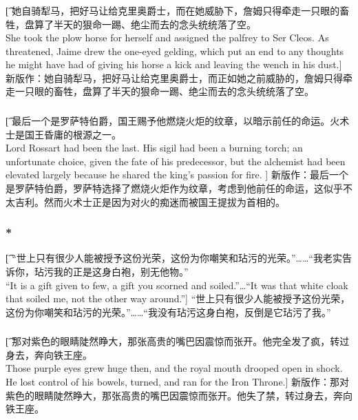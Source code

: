 \documentclass[12pt,a4paper]{article}
\begin{document}
\subsubsection{}\t[
	她自骑犁马，把好马让给克里奥爵士，而在她威胁下，詹姆只得牵走一只眼的畜牲，盘算了半天的狠命一踢、绝尘而去的念头统统落了空。\\
	She took the plow horse for herself and assigned the palfrey to Ser Cleos. As threatened, Jaime drew the one-eyed gelding, which put an end to any thoughts he might have had of giving his horse a kick and leaving the wench in his dust.]
	新版作：她自骑犁马，把好马让给克里奥爵士，而正如她之前威胁的，詹姆只得牵走一只眼的畜牲，盘算了半天的狠命一踢、绝尘而去的念头统统落了空。
	
\subsubsection{}\t[
	最后一个是罗萨特伯爵，国王赐予他燃烧火炬的纹章，以暗示前任的命运。火术士是国王昏庸的根源之一。\\
	Lord Rossart had been the last. His sigil had been a burning torch; an unfortunate choice, given the fate of his predecessor, but the alchemist had been elevated largely because he shared the king's passion for fire.  ]
	新版作：最后一个是罗萨特伯爵，罗萨特选择了燃烧火炬作为纹章，考虑到他前任的命运，这似乎不太吉利。然而火术士正是因为对火的痴迷而被国王提拔为首相的。

\subsubsection{\color{red}*}\t[		
“世上只有很少人能被授予这份光荣，这份为你嘲笑和玷污的光荣。”……“我老实告诉你，玷污我的正是这身白袍，别无他物。”\\		
“It is a gift given to few, a gift you scorned and soiled.”\ldots “It was that white cloak that soiled me, not the other way around.”]		
“世上只有很少人能被授予这份光荣，这份为你嘲笑和玷污的光荣。”……“我没有玷污这身白袍，反倒是它玷污了我。”	

\subsubsection{}\t[
	那对紫色的眼睛陡然睁大，那张高贵的嘴巴因震惊而张开。他完全发了疯，转过身去，奔向铁王座。\\
	Those purple eyes grew huge then, and the royal mouth drooped open in shock. He lost control of his bowels, turned, and ran for the Iron Throne.]
	新版作：那对紫色的眼睛陡然睁大，那张高贵的嘴巴因震惊而张开。他失了禁，转过身去，奔向铁王座。
	
\end{document}
